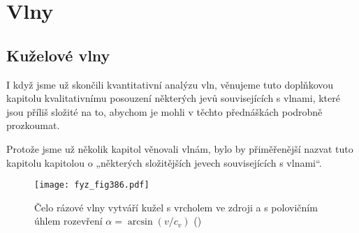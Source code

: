 {
\chapter{Vlny}\label{fyz:IchapLI}
\minitoc
\section{Kuželové vlny}\label{fyz:IchapLIsecI}
  I když jsme už skončili kvantitativní analýzu vln, věnujeme tuto doplňkovou kapitolu 
  kvalitativnímu posouzení některých jevů souvisejících s vlnami, které jsou příliš složité na to, 
  abychom je mohli v těchto přednáškách podrobně prozkoumat.
  
  Protože jsme už několik kapitol věnovali vlnám, bylo by přiměřenější nazvat tuto kapitolu 
  kapitolou o „některých složitějších jevech souvisejících s vlnami“.
  
  \begin{figure}[ht!] %
    \centering
    \texttt{[image: fyz\_fig386.pdf]}
    \caption{Čelo rázové vlny vytváří kužel s vrcholem ve zdroji a s polovičním úhlem rozevření
             \(\alpha =\arcsin(v/c_v)\)
             (\cite[s.~686]{Feynman01})}
    \label{fyz:fig386}
  \end{figure}

}
